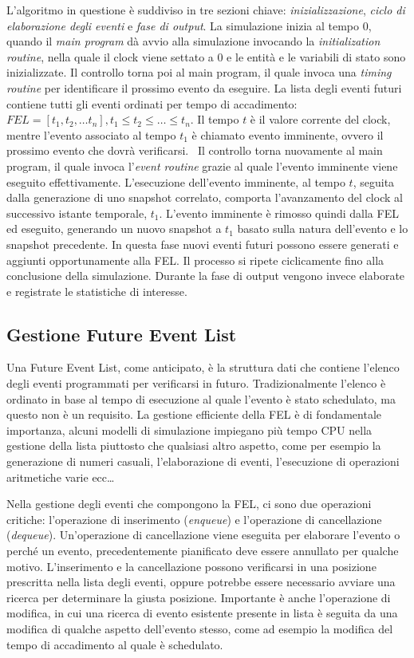 L'algoritmo in questione è suddiviso in tre sezioni chiave: \textit{inizializzazione}, \textit{ciclo di elaborazione degli eventi} e \textit{fase di output}.
La simulazione inizia al tempo 0, quando il \textit{main program} dà avvio alla simulazione invocando la \textit{initialization routine}, nella quale il clock viene settato a 0 e le entità e le variabili di stato sono inizializzate.
Il controllo torna poi al main program, il quale invoca una \textit{timing routine} per identificare il prossimo evento da eseguire.
La lista degli eventi futuri contiene tutti gli eventi ordinati per tempo di accadimento: $FEL = [t_1, t_2, \dots t_n], t_1 \leq t_2 \leq \dots \leq t_n$. 
Il tempo $t$ è il valore corrente del clock, mentre l'evento associato al tempo $t_1$ è chiamato evento imminente, ovvero il prossimo evento che dovrà verificarsi.~\cite{DBLP:books/daglib/0034857}
Il controllo torna nuovamente al main program, il quale invoca l'\textit{event routine} grazie al quale l'evento imminente viene eseguito effettivamente. 
L'esecuzione dell'evento imminente, al tempo $t$, seguita dalla generazione di uno snapshot correlato, comporta l'avanzamento del clock al successivo istante temporale, $t_1$. L'evento imminente è rimosso quindi dalla FEL ed eseguito, generando un nuovo snapshot a $t_1$ basato sulla natura dell'evento e lo snapshot precedente. In questa fase nuovi eventi futuri possono essere generati e aggiunti opportunamente alla FEL.
Il processo si ripete ciclicamente fino alla conclusione della simulazione. 
Durante la fase di output vengono invece elaborate e registrate le statistiche di interesse. 


\subsection{Gestione Future Event List}
Una Future Event List, come anticipato, è la struttura dati che contiene l'elenco degli eventi programmati per verificarsi in futuro. Tradizionalmente l'elenco è ordinato in base al tempo di esecuzione al quale l'evento è stato schedulato, ma questo non è un requisito. 
La gestione efficiente della FEL è di fondamentale importanza, alcuni modelli di simulazione impiegano più tempo CPU nella gestione della lista piuttosto che qualsiasi altro aspetto, come per esempio la generazione di numeri casuali, l'elaborazione di eventi, l'esecuzione di operazioni aritmetiche varie ecc\dots

Nella gestione degli eventi che compongono la FEL, ci sono due operazioni critiche: l'operazione di inserimento (\textit{enqueue}) e l'operazione di cancellazione (\textit{dequeue}). Un'operazione di cancellazione viene eseguita per elaborare l'evento o perché un evento, precedentemente pianificato deve essere annullato per qualche motivo. L'inserimento e la cancellazione possono verificarsi in una posizione prescritta nella lista degli eventi, oppure potrebbe essere necessario avviare una ricerca per determinare la giusta posizione. 
Importante è anche l'operazione di modifica, in cui una ricerca di evento esistente presente in lista è seguita da una modifica di qualche aspetto dell'evento stesso, come ad esempio la modifica del tempo di accadimento al quale è schedulato. 

